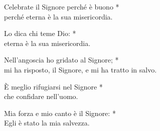 

\spazio

\strofa Celebrate il Signore perché è buono *\\
perché eterna è la sua misericordia.

\spazio


\spazio

\strofa Lo dica chi teme Dio: *\\
eterna è la sua misericordia.

\spazio


\spazio

\strofa Nell'angoscia ho gridato al Signore; *\\
mi ha risposto, il Signore, e mi ha tratto in salvo.

\spazio


\spazio

\strofa È meglio rifugiarsi nel Signore *\\
che confidare nell'uomo.

\spazio


\spazio

\strofa Mia forza e mio canto è il Signore: *\\
Egli è stato la mia salvezza.

\spazio

